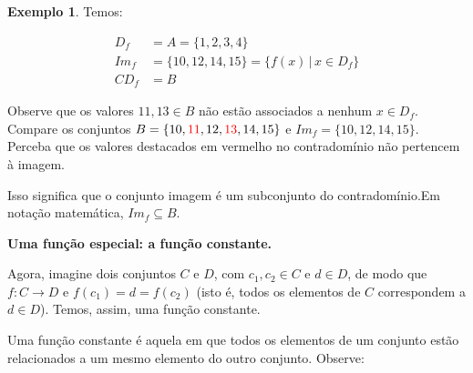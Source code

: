 \documentclass[12pt,openright,twoside,a4paper]{article}
\theoremstyle{definition}
\newtheorem{example}{Exemplo}[section]
\begin{document}
\begin{example}
		Temos:
		
		\begin{align*}
			D_f &= A = \{1,2,3,4\}\\
			Im_f &= \{10, 12, 14, 15\} = \{f(x) \,|\, x \in D_f\} \\
			CD_f &= B			
		\end{align*}
		
		Observe que os valores $11, 13 \in B$ não estão associados a nenhum $x \in D_f$. Compare os conjuntos $B = \{10, \textcolor{red}{11}, 12, \textcolor{red}{13}, 14, 15\}$ e $Im_f = \{10, 12, 14, 15\}$. Perceba que os valores destacados em vermelho no contradomínio não pertencem à imagem.
		
		Isso significa que o conjunto imagem é um subconjunto do contradomínio.Em notação matemática, $Im_f \subseteq B$. 
	\end{example}
	
	\textbf{Uma função especial: a função constante.}
	
	Agora, imagine dois conjuntos $C$ e $D$, com $c_1, c_2 \in C$ e $d \in D$, de modo que $f: C \longrightarrow D$ e $f(c_1) = d = f(c_2)$ (isto é, todos os elementos de $C$ correspondem a $d \in D$). Temos, assim, uma função constante.
	
	Uma função constante é aquela em que todos os elementos de um conjunto estão relacionados a um mesmo elemento do outro conjunto. Observe:
	
\end{document}
